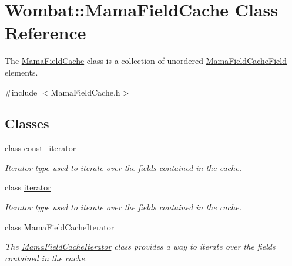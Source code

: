 \hypertarget{classWombat_1_1MamaFieldCache}{
\section{Wombat::MamaFieldCache Class Reference}
\label{classWombat_1_1MamaFieldCache}
}


The {\ttfamily \hyperlink{classWombat_1_1MamaFieldCache}{MamaFieldCache}} class is a collection of unordered {\ttfamily \hyperlink{classWombat_1_1MamaFieldCacheField}{MamaFieldCacheField}} elements.  


{\ttfamily \#include $<$MamaFieldCache.h$>$}\subsection*{Classes}
\begin{DoxyCompactItemize}
\item 
class \hyperlink{classWombat_1_1MamaFieldCache_1_1const__iterator}{const\_\-iterator}
\begin{DoxyCompactList}\small\item\em Iterator type used to iterate over the fields contained in the cache. \item\end{DoxyCompactList}\item 
class \hyperlink{classWombat_1_1MamaFieldCache_1_1iterator}{iterator}
\begin{DoxyCompactList}\small\item\em Iterator type used to iterate over the fields contained in the cache. \item\end{DoxyCompactList}\item 
class \hyperlink{classWombat_1_1MamaFieldCache_1_1MamaFieldCacheIterator}{MamaFieldCacheIterator}
\begin{DoxyCompactList}\small\item\em The {\ttfamily \hyperlink{classWombat_1_1MamaFieldCache_1_1MamaFieldCacheIterator}{MamaFieldCacheIterator}} class provides a way to iterate over the fields contained in the cache. \item\end{DoxyCompactList}\end{DoxyCompactItemize}
